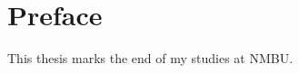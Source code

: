 \documentclass[class=book, crop=false]{standalone}
\begin{document}
\chapter{Preface}
This thesis marks the end of my studies at NMBU.
\end{document}
